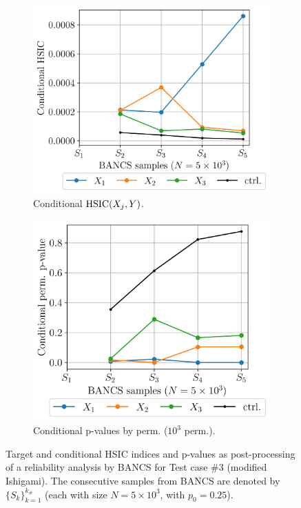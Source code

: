 \begin{figure}
\begin{subfigure}[b]{0.48\linewidth}
    \end{subfigure}
    \\[20pt]
    \begin{subfigure}[b]{0.48\linewidth}
        \centering
        \includegraphics[width=\linewidth]{part3/figures/BANCS/ishigami_CHSIC.png}
        \caption{Conditional $\mathrm{HSIC}(X_j, Y)$.}
    \end{subfigure}
    \begin{subfigure}[b]{0.48\linewidth}
        \centering
        \includegraphics[width=\linewidth]{part3/figures/BANCS/ishigami_Cpvalue_permutation.png}
        \caption{Conditional p-values by perm. ($10^3$ perm.).}
    \end{subfigure}
    \caption{Target and conditional HSIC indices and p-values as post-processing of a reliability analysis by BANCS for Test case \#3 (modified Ishigami). 
                The consecutive samples from BANCS are denoted by $\{S_k\}_{k=1}^{k_\#}$ (each with size $N=5\times10^3$, with $p_0=0.25$).}
    \label{fig:rosa_ishigami}
\end{figure}


